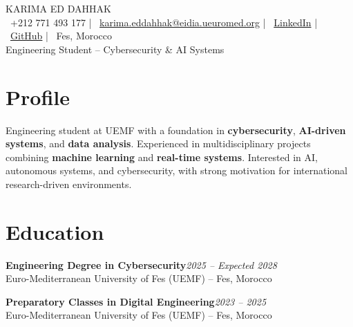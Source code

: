 \documentclass[10pt,a4paper]{article}
\newcommand{\entry}[3]{\textbf{#1}\hfill\textit{\small #2}\\#3\par}
\newcommand{\lnk}[2]{\href{#1}{\color{linkblue}#2}}
\begin{document}
\begin{center}
  {\LARGE\color{navy} KARIMA ED DAHHAK}\\[3pt]
  \small
  \faPhone\ +212 771 493 177 \quad|\quad
  \faEnvelope\ \lnk{mailto:karima.eddahhak@eidia.ueuromed.org}{karima.eddahhak@eidia.ueuromed.org} \quad|\quad
  \faLinkedin\ \lnk{https://www.linkedin.com/in/karima-ed-dahhak-8708461a9/}{LinkedIn} \quad|\quad
  \faGithub\ \lnk{https://github.com/kdeeey}{GitHub} \quad|\quad
  \faMapMarker*\ Fes, Morocco\\[1pt]
  {\color{linkblue}Engineering Student -- Cybersecurity \& AI Systems}
\end{center}

\section{Profile}
Engineering student at UEMF with a foundation in \textbf{cybersecurity}, \textbf{AI-driven systems}, and \textbf{data analysis}. Experienced in multidisciplinary projects combining \textbf{machine learning} and \textbf{real-time systems}. Interested in AI, autonomous systems, and cybersecurity, with strong motivation for international research-driven environments.

\section{Education}
\entry{Engineering Degree in Cybersecurity}{2025 -- Expected 2028}{Euro-Mediterranean University of Fes (UEMF) -- Fes, Morocco}
\entry{Preparatory Classes in Digital Engineering}{2023 -- 2025}{Euro-Mediterranean University of Fes (UEMF) -- Fes, Morocco}
\end{document}
